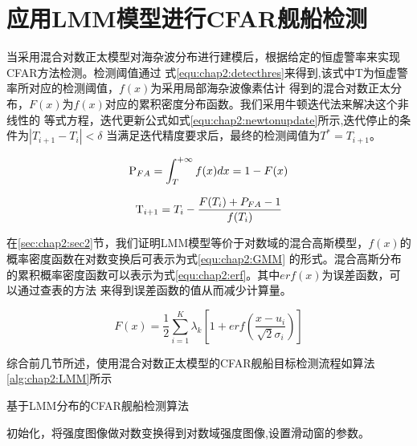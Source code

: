 \section{应用LMM模型进行CFAR舰船检测}
    当采用混合对数正太模型对海杂波分布进行建模后，根据给定的恒虚警率来实现CFAR方法检测。检测阈值通过
    式\ref{equ:chap2:detecthres}来得到,该式中T为恒虚警率所对应的检测阈值，$f(x)$为采用局部海杂波像素估计
    得到的混合对数正太分布，$F(x)$为$f(x)$对应的累积密度分布函数。我们采用牛顿迭代法来解决这个非线性的
    等式方程，迭代更新公式如式\ref{equ:chap2:newtonupdate}所示,迭代停止的条件为$\left| {{T_{i + 1}} - {T_i}} \right| < \delta$
    当满足迭代精度要求后，最终的检测阈值为${T^*} = {T_{i + 1}}$。

    \begin{equation}
      \label{equ:chap2:detecthres}
      {{\rm{P}}_{FA}} = \int_T^{ + \infty } {f(x)dx = 1 - F(x)}
    \end{equation}

    \begin{equation}
      \label{equ:chap2:newtonupdate}
      {{\rm{T}}_{i + 1}} = {T_i} - \frac{{F({T_i}) + {P_{FA}} - 1}}{{f({T_i})}}
    \end{equation}

    在\ref{sec:chap2:sec2}节，我们证明LMM模型等价于对数域的混合高斯模型，$f(x)$的概率密度函数在对数变换后可表示为式\ref{equ:chap2:GMM}
    的形式。混合高斯分布的累积概率密度函数可以表示为式\ref{equ:chap2:erf}。其中$erf(x)$为误差函数，可以通过查表的方法
    来得到误差函数的值从而减少计算量。

    \begin{equation}
      \label{equ:chap2:erf}
      F(x) = \frac{1}{2}\sum\limits_{i = 1}^K {{\lambda _k}[1 + erf(\frac{{x - {u_i}}}{{\sqrt 2 {\sigma _i}}})]}
    \end{equation}

    综合前几节所述，使用混合对数正太模型的CFAR舰船目标检测流程如算法\ref{alg:chap2:LMM}所示

    \begin{algorithm}[t]
      \caption{基于LMM分布的CFAR舰船检测算法}
      \label{alg:chap2:LMM}
      \BlankLine
      初始化，将强度图像做对数变换得到对数域强度图像,设置滑动窗的参数。

    \end{algorithm}

